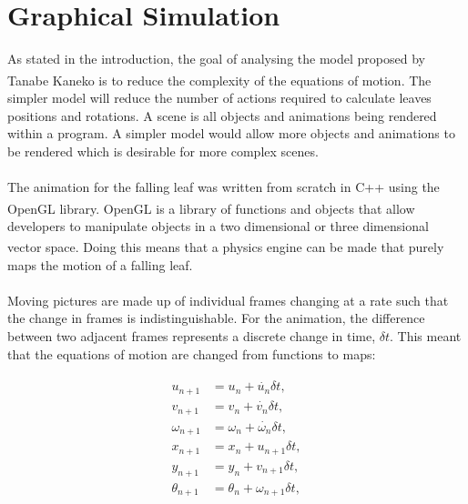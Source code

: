 \section{Graphical Simulation}

As stated in the introduction, the goal of analysing the model proposed by Tanabe Kaneko\textsuperscript{\cite{tanabe1994behavior}} is to reduce the complexity of the equations of motion. The simpler model will reduce the number of actions required to calculate leaves positions and rotations. A scene is all objects and animations being rendered within a program. A simpler model would allow more objects and animations to be rendered which is desirable for more complex scenes.
\\
\\
\noindent The animation for the falling leaf was written from scratch in C++ using the OpenGL\textsuperscript{\textregistered} library. OpenGL\textsuperscript{\textregistered} is a library of functions and objects that allow developers to manipulate objects in a two dimensional or three dimensional vector space\textsuperscript{\cite{opengl}}. Doing this means that a physics engine can be made that purely maps the motion of a falling leaf.
\\
\\
\noindent Moving pictures are made up of individual frames changing at a rate such that the change in frames is indistinguishable. For the animation, the difference between two adjacent frames represents a discrete change in time, $\delta t$. This meant that the equations of motion are changed from functions to maps:

\begin{align}
\begin{split}
u_{n+1} &= u_{n} + \dot{u_{n}}\delta t, \\
v_{n+1} &= v_{n} + \dot{v_{n}}\delta t, \\
\omega_{n+1} &= \omega_{n} + \dot{\omega_{n}}\delta t, \\
x_{n+1} &= x_{n} + u_{n+1}\delta t, \\
y_{n+1} &= y_{n} + v_{n+1}\delta t, \\
\theta_{n+1} &= \theta_{n} + \omega_{n+1} \delta t,
\end{split}
\label{eq:discretetime}
\end{align}

